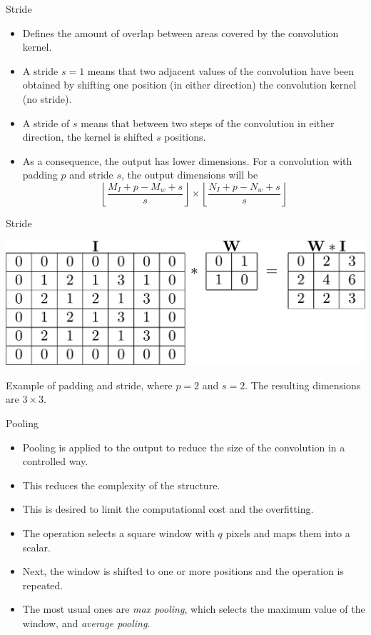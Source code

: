 \documentclass{beamer}
\begin{document}
\begin{frame}{Stride}
\begin{itemize}
\item Defines the amount of overlap between areas covered by the convolution kernel.
\item A stride $s=1$ means that two adjacent values of the convolution have been obtained by shifting one position (in either direction) the convolution kernel (no stride).

\item A stride of  $s$ means that between two steps of the convolution in either direction, the kernel is shifted $s$ positions.

\item As a consequence, the output has lower dimensions. For a convolution with padding $p$ and stride $s$, the output dimensions will be
\begin{equation}\label{eq:conv_dimensions}
\left\lfloor\frac{M_I+p-M_w+s}{s}\right\rfloor\times
\left\lfloor\frac{N_I+p-N_w+s}{s}\right\rfloor
\end{equation}

    \end{itemize}
\end{frame}

\begin{frame}{Stride}
\begin{center}
    \includegraphics[scale=0.35]{Module 4 (CNN)/pics/conv_stride.pdf}
\end{center}
 Example of padding and stride, where $p=2$ and $s=2$. The resulting dimensions are $3\times 3$.
\end{frame}


\begin{frame}{Pooling}

\begin{itemize}
\item Pooling is applied to the output to reduce the size of the convolution in a controlled way.
\item This reduces the complexity of the structure. 
\item This is desired to limit the computational cost and the overfitting.
\item The operation selects a square window with $q$ pixels and maps them into a scalar.
\item Next, the window is shifted to one or more positions and the operation is repeated. 
\item The most usual ones are \emph{max pooling}, which selects the maximum value of the window, and \emph{average pooling}. 
\end{itemize}
\end{frame}
\end{document}
